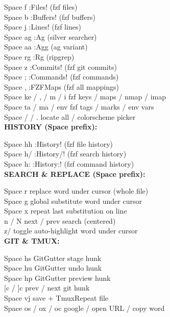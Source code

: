 \documentclass[11pt,a4paper,twoside]{book}
\begin{document}
Space f               :Files! (fzf files)\\
Space b               :Buffers! (fzf buffers)\\
Space j               :Lines! (fzf lines)\\
Space ag              :Ag (silver searcher)\\
Space aa              :Agg (ag variant)\\
Space rg              :Rg (ripgrep)\\
Space z               :Commits! (fzf git commits)\\
Space ;               :Commands! (fzf commands)\\
Space ,               :FZFMaps (fzf all mappings)\\
Space ke / , / m / i  fzf keys / maps / nmap / imap\\
Space ta / ma / env  fzf tags / marks / env vars\\
Space / / .           locate all / colorscheme picker\\


\vspace{12pt}
{\bfseries\color{neonyellow} HISTORY (Space prefix):}\vspace{4pt}

Space hh              :History! (fzf file history)\\
Space h/              :History/! (fzf search history)\\
Space h:              :History:! (fzf command history)\\


\vspace{12pt}
{\bfseries\color{neonyellow} SEARCH \& REPLACE (Space prefix):}\vspace{4pt}

Space r               replace word under cursor (whole file)\\
Space g               global substitute word under cursor\\
Space x               repeat last substitution on line\\
n / N                 next / prev search (centered)\\
z/                    toggle auto-highlight word under cursor\\


\vspace{12pt}
{\bfseries\color{neonyellow} GIT \& TMUX:}\vspace{4pt}

Space hs              GitGutter stage hunk\\
Space hu              GitGutter undo hunk\\
Space hp              GitGutter preview hunk\\
{[}c / ]c              prev / next git hunk\\
Space vj              save + TmuxRepeat file\\
Space os / ox / oc   google / open URL / copy word\\
\end{document}
